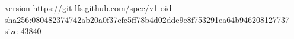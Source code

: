 version https://git-lfs.github.com/spec/v1
oid sha256:080482374742ab20a0f37cfc5ff78b4d02dde9e8f753291ea64b946208127737
size 43840
